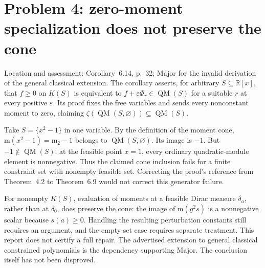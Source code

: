 \documentclass[10pt]{article}
\begin{document}
\section*{Problem 4: zero-moment specialization does not preserve the cone}
Location and assessment: Corollary 6.14, p. 32; Major for the invalid derivation of the general classical extension. The corollary asserts, for arbitrary \(S\subseteq\mathbb R[x]\), that \(f\ge0\) on \(K(S)\) is equivalent to \(f+\varepsilon\Phi_r\in\operatorname{QM}(S)\) for a suitable \(r\) at every positive \(\varepsilon\). Its proof fixes the free variables and sends every nonconstant moment to zero, claiming \(\zeta(\operatorname{QM}(S,\varnothing))\subseteq\operatorname{QM}(S)\).\par
Take \(S=\{x^2-1\}\) in one variable. By the definition of the moment cone, \(\mathrm{m}(x^2-1)=\mathrm{m}_2-1\) belongs to \(\operatorname{QM}(S,\varnothing)\). Its image is \(-1\). But \(-1\notin\operatorname{QM}(S)\): at the feasible point \(x=1\), every ordinary quadratic-module element is nonnegative. Thus the claimed cone inclusion fails for a finite constraint set with nonempty feasible set. Correcting the proof’s reference from Theorem 4.2 to Theorem 6.9 would not correct this generator failure.\par
For nonempty \(K(S)\), evaluation of moments at a feasible Dirac measure \(\delta_a\), rather than at \(\delta_0\), does preserve the cone: the image of \(\mathrm{m}(g^2s)\) is a nonnegative scalar because \(s(a)\ge0\). Handling the resulting perturbation constants still requires an argument, and the empty-set case requires separate treatment. This report does not certify a full repair. The advertised extension to general classical constrained polynomials is the dependency supporting Major. The conclusion itself has not been disproved.\par
\end{document}
